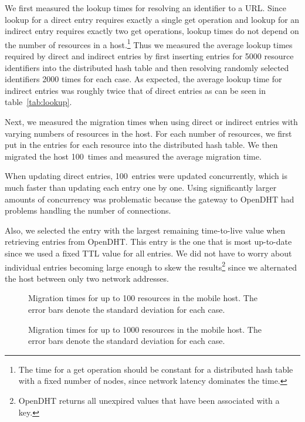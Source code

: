 \documentclass{article}
\begin{document}
We first measured the lookup times for resolving an identifier to a
URL.  Since lookup for a direct entry requires exactly a single get
operation and lookup for an indirect entry requires exactly two get
operations, lookup times do not depend on the number of resources in a
host.\footnote{The time for a get operation should be constant for a
  distributed hash table with a fixed number of nodes, since network
  latency dominates the time.}  Thus we measured the average lookup
times required by direct and indirect entries by first inserting
entries for 5000 resource identifiers into the distributed hash table
and then resolving randomly selected identifiers 2000 times for each
case.  As expected, the average lookup time for indirect entries was
roughly twice that of direct entries as can be seen in
table~\ref{tab:lookup}.

Next, we measured the migration times when using direct or indirect
entries with varying numbers of resources in the host.  For each
number of resources, we first put in the entries for each resource
into the distributed hash table.  We then migrated the host 100~times
and measured the average migration time.

When updating direct entries, 100~entries were updated concurrently,
which is much faster than updating each entry one by one.  Using
significantly larger amounts of concurrency was problematic because
the gateway to OpenDHT had problems handling the number of
connections.

Also, we selected the entry with the largest remaining time-to-live
value when retrieving entries from OpenDHT.  This entry is the one
that is most up-to-date since we used a fixed TTL value for all
entries.  We did not have to worry about individual entries becoming
large enough to skew the results\footnote{OpenDHT returns all
  unexpired values that have been associated with a key.} since we
alternated the host between only two network addresses.

\begin{figure}
  \centering
  \caption{Migration times for up to 100 resources in the mobile host.
    The error bars denote the standard deviation for each case.}
  \label{fig:migration-100}
\end{figure}

\begin{figure}
  \centering
  \caption{Migration times for up to 1000 resources in the mobile
    host.  The error bars denote the standard deviation for each
    case.}
  \label{fig:migration-1000}
\end{figure}
\end{document}
